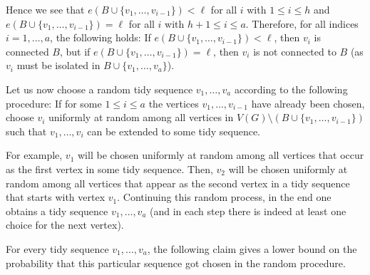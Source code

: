 \documentclass[11pt]{article}
\theoremstyle{definition}
\numberwithin{equation}{section}
\begin{document}
Hence we see that $e(B\cup \lbrace v_1,\dots,v_{i-1}\rbrace)<\ell$ for all $i$ with $1\leq i\leq h$ and $e(B\cup \lbrace v_1,\dots,v_{i-1}\rbrace)=\ell$ for all $i$ with $h+1\leq i\leq a$. Therefore, for all indices $i=1,\dots,a$, the following holds: If $e(B\cup \lbrace v_1,\dots,v_{i-1}\rbrace)<\ell$, then $v_i$ is connected $B$, but if $e(B\cup \lbrace v_1,\dots,v_{i-1}\rbrace)=\ell$, then $v_i$ is not connected to $B$ (as $v_i$ must be isolated in $B\cup \lbrace v_1,\dots,v_a\rbrace$).

Let us now choose a random tidy sequence $v_1,\dots,v_a$ according to the following procedure: If for some $1\leq i\leq a$ the vertices $v_1,\dots, v_{i-1}$ have already been chosen, choose $v_{i}$ uniformly at random among all vertices in $V(G)\setminus (B\cup \lbrace v_1,\dots, v_{i-1}\rbrace)$ such that $v_1,\dots, v_{i}$ can be extended to some tidy sequence.

For example, $v_1$ will be chosen uniformly at random among all vertices that occur as the first vertex in some tidy sequence. Then, $v_2$ will be chosen uniformly at random among all vertices that appear as the second vertex in a tidy sequence that starts with vertex $v_1$. Continuing this random process, in the end one obtains a tidy sequence $v_1,\dots,v_a$ (and in each step there is indeed at least one choice for the next vertex).

For every tidy sequence $v_1,\dots,v_a$, the following claim gives a lower bound on the probability that this particular sequence got chosen in the random procedure.
\end{document}
